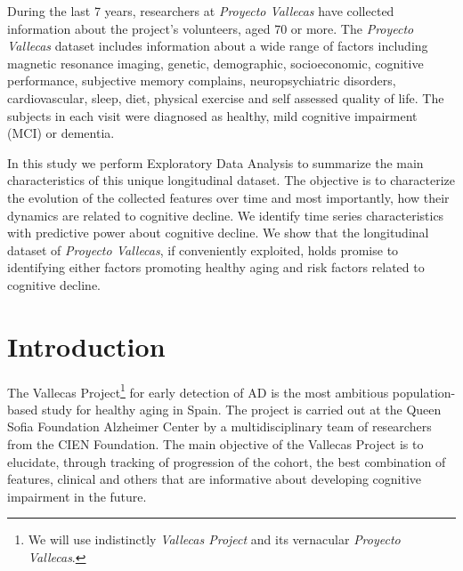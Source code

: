 \documentclass[11pt]{article}
\theoremstyle{definition}
\theoremstyle{remark}
\begin{document}
During the last 7 years, researchers at \emph{Proyecto Vallecas} have collected information about the project's volunteers, aged 70 or more. The \emph{Proyecto Vallecas} dataset includes information about a wide range of factors including magnetic resonance imaging, genetic, demographic, socioeconomic, cognitive performance, subjective memory complains, neuropsychiatric disorders, cardiovascular, sleep, diet, physical exercise and self assessed quality of life. The subjects in each visit were diagnosed as healthy, mild cognitive impairment (MCI) or dementia. 

In this study we perform Exploratory Data Analysis to summarize the main characteristics of this unique longitudinal dataset. The objective is to characterize the evolution of the collected features over time and most importantly, how their dynamics are related to cognitive decline. 
We identify time series characteristics with predictive power about cognitive decline. We show that the longitudinal dataset of \emph{Proyecto Vallecas}, if conveniently exploited, holds promise to identifying either factors promoting healthy aging and risk factors related to cognitive decline. 
 
\section{Introduction}
\label{se:int}
The Vallecas Project\footnote{We will use indistinctly \emph{Vallecas Project} and its vernacular \emph{Proyecto Vallecas}.} for early detection of AD is the most ambitious population-based study for healthy aging in Spain. The project is carried out at the Queen Sofia Foundation Alzheimer Center by a multidisciplinary team of researchers from the CIEN Foundation. The main objective of the Vallecas Project is to elucidate, through tracking of progression of the cohort, the best combination of features, clinical and others that are informative about developing cognitive impairment in the future. 
\end{document}
